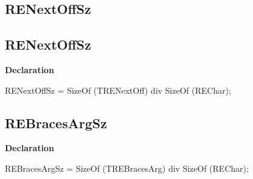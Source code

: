 \documentclass{report}
\newif\ifpdf
\begin{document}
\subsection*{\large{\textbf{RENextOffSz}}\normalsize\hspace{1ex}\hrulefill}
\else
\subsection*{RENextOffSz}
\fi
\label{RegExpr-RENextOffSz}
\begin{list}{}{
\setlength{\itemindent}{0cm}
\setlength{\listparindent}{0cm}
\setlength{\leftmargin}{\evensidemargin}
\addtolength{\leftmargin}{\tmplength}
\settowidth{\labelsep}{X}
\addtolength{\leftmargin}{\labelsep}
\setlength{\labelwidth}{\tmplength}
}
\item[\textbf{Declaration}\hfill]
\ifpdf
\begin{flushleft}
\fi
\begin{ttfamily}
RENextOffSz = SizeOf (TRENextOff) div SizeOf (REChar);\end{ttfamily}

\ifpdf
\end{flushleft}
\fi

\end{list}
\ifpdf
\subsection*{\large{\textbf{REBracesArgSz}}\normalsize\hspace{1ex}\hrulefill}
\else
\subsection*{REBracesArgSz}
\fi
\label{RegExpr-REBracesArgSz}
\begin{list}{}{
\setlength{\itemindent}{0cm}
\setlength{\listparindent}{0cm}
\setlength{\leftmargin}{\evensidemargin}
\addtolength{\leftmargin}{\tmplength}
\settowidth{\labelsep}{X}
\addtolength{\leftmargin}{\labelsep}
\setlength{\labelwidth}{\tmplength}
}
\item[\textbf{Declaration}\hfill]
\ifpdf
\begin{flushleft}
\fi
\begin{ttfamily}
REBracesArgSz = SizeOf (TREBracesArg) div SizeOf (REChar);\end{ttfamily}

\ifpdf
\end{flushleft}
\fi

\end{list}
\ifpdf
\end{document}

